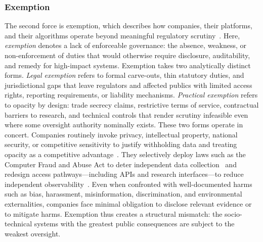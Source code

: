 \documentclass[acmsmall,screen]{acmart}
\begin{document}
\subsubsection*{Exemption}
The second force is exemption, which describes how companies, their platforms, and their algorithms operate beyond meaningful regulatory scrutiny~\cite{suzor2018digital}. Here, \textit{exemption} denotes a lack of enforceable governance: the absence, weakness, or non-enforcement of duties that would otherwise require disclosure, auditability, and remedy for high-impact systems. Exemption takes two analytically distinct forms. \textit{Legal exemption} refers to formal carve-outs, thin statutory duties, and jurisdictional gaps that leave regulators and affected publics with limited access rights, reporting requirements, or liability mechanisms. \textit{Practical exemption} refers to opacity by design: trade secrecy claims, restrictive terms of service, contractual barriers to research, and technical controls that render scrutiny infeasible even where some oversight authority nominally exists. These two forms operate in concert. Companies routinely invoke privacy, intellectual property, national security, or competitive sensitivity to justify withholding data and treating opacity as a competitive advantage~\cite{suzor2018digital,obar2020biggest}. They selectively deploy laws such as the Computer Fraud and Abuse Act to deter independent data collection~\cite{ACLU_Sandvig_2019} and redesign access pathways---including APIs and research interfaces---to reduce independent observability~\cite{van_der_vlist_api_2022}. Even when confronted with well-documented harms such as bias, harassment, misinformation, discrimination, and environmental externalities, companies face minimal obligation to disclose relevant evidence or to mitigate harms. Exemption thus creates a structural mismatch: the socio-technical systems with the greatest public consequences are subject to the weakest oversight.
\end{document}
